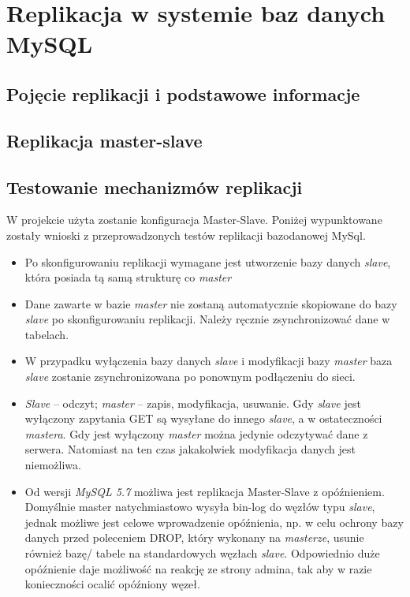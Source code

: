 \chapter{Replikacja w systemie baz danych MySQL}

\section{Pojęcie replikacji i podstawowe informacje}

\section{Replikacja master-slave}

\section{Testowanie mechanizmów replikacji}

W projekcie użyta zostanie konfiguracja Master-Slave. Poniżej wypunktowane zostały wnioski z przeprowadzonych testów replikacji bazodanowej MySql.

\begin{itemize}
	\item Po skonfigurowaniu replikacji wymagane jest utworzenie bazy danych \textit{slave}, która posiada
	tą samą strukturę co \textit{master}
	\item Dane zawarte w bazie \textit{master} nie zostaną automatycznie skopiowane do bazy \textit{slave} po
	skonfigurowaniu replikacji. Należy ręcznie zsynchronizować dane w tabelach.
	\item W przypadku wyłączenia bazy danych \textit{slave} i modyfikacji bazy \textit{master} baza \textit{slave} zostanie
	zsynchronizowana po ponownym podłączeniu do sieci.
	\item \textit{Slave} – odczyt; \textit{master} – zapis, modyfikacja, usuwanie. Gdy \textit{slave} jest wyłączony zapytania
	GET są wysyłane do innego \textit{slave}, a w ostateczności \textit{mastera}. Gdy jest wyłączony \textit{master}
	można jedynie odczytywać dane z serwera. Natomiast na ten czas jakakolwiek modyfikacja
	danych jest niemożliwa.
	\item Od wersji\textit{ MySQL 5.7} możliwa jest replikacja Master-Slave z opóźnieniem. Domyślnie master natychmiastowo wysyła bin-log do węzłów typu \textit{slave}, jednak możliwe jest celowe wprowadzenie opóźnienia, np. w celu ochrony bazy danych przed poleceniem DROP, który wykonany na \textit{masterze}, usunie również bazę/ tabele na standardowych węzłach \textit{slave}. Odpowiednio duże opóźnienie daje możliwość na reakcję ze strony admina, tak aby w razie konieczności ocalić opóźniony węzeł.
\end{itemize}



